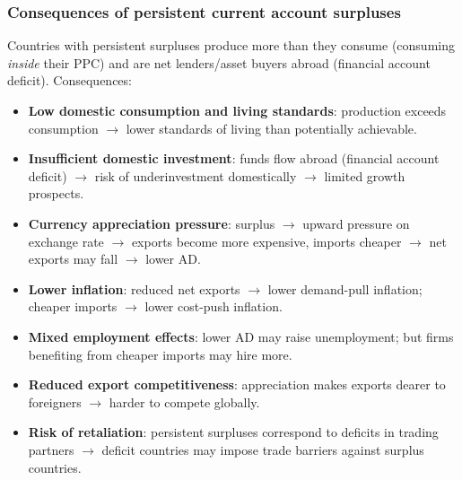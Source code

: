 \subsubsection*{Consequences of persistent current account surpluses}
Countries with persistent surpluses produce more than they consume (consuming \textit{inside} their PPC) and are net lenders/asset buyers abroad (financial account deficit). Consequences:
\begin{itemize}
  \item \textbf{Low domestic consumption and living standards}: production exceeds consumption $\to$ lower standards of living than potentially achievable.
  \item \textbf{Insufficient domestic investment}: funds flow abroad (financial account deficit) $\to$ risk of underinvestment domestically $\to$ limited growth prospects.
  \item \textbf{Currency appreciation pressure}: surplus $\to$ upward pressure on exchange rate $\to$ exports become more expensive, imports cheaper $\to$ net exports may fall $\to$ lower AD.
  \item \textbf{Lower inflation}: reduced net exports $\to$ lower demand-pull inflation; cheaper imports $\to$ lower cost-push inflation.
  \item \textbf{Mixed employment effects}: lower AD may raise unemployment; but firms benefiting from cheaper imports may hire more.
  \item \textbf{Reduced export competitiveness}: appreciation makes exports dearer to foreigners $\to$ harder to compete globally.
  \item \textbf{Risk of retaliation}: persistent surpluses correspond to deficits in trading partners $\to$ deficit countries may impose trade barriers against surplus countries.
\end{itemize}
